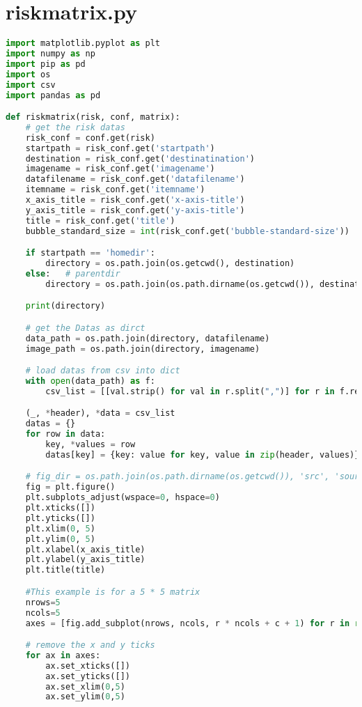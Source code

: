 
\section{riskmatrix.py}
\begin{lstlisting}[language=python, caption=Python LaTex - riskmatrix - Risxikomatrizen,captionpos=b,label={lst:riskmatrix},breaklines=true]
import matplotlib.pyplot as plt
import numpy as np
import pip as pd
import os
import csv
import pandas as pd

def riskmatrix(risk, conf, matrix):
    # get the risk datas
    risk_conf = conf.get(risk)
    startpath = risk_conf.get('startpath')
    destination = risk_conf.get('destinatination')
    imagename = risk_conf.get('imagename')
    datafilename = risk_conf.get('datafilename')
    itemname = risk_conf.get('itemname')
    x_axis_title = risk_conf.get('x-axis-title')
    y_axis_title = risk_conf.get('y-axis-title')
    title = risk_conf.get('title')
    bubble_standard_size = int(risk_conf.get('bubble-standard-size'))

    if startpath == 'homedir':
        directory = os.path.join(os.getcwd(), destination)
    else:   # parentdir
        directory = os.path.join(os.path.dirname(os.getcwd()), destination)

    print(directory)

    # get the Datas as dirct
    data_path = os.path.join(directory, datafilename)
    image_path = os.path.join(directory, imagename)

    # load datas from csv into dict
    with open(data_path) as f:
        csv_list = [[val.strip() for val in r.split(",")] for r in f.readlines()]

    (_, *header), *data = csv_list
    datas = {}
    for row in data:
        key, *values = row
        datas[key] = {key: value for key, value in zip(header, values)}

    # fig_dir = os.path.join(os.path.dirname(os.getcwd()), 'src', 'source')
    fig = plt.figure()
    plt.subplots_adjust(wspace=0, hspace=0)
    plt.xticks([])
    plt.yticks([])
    plt.xlim(0, 5)
    plt.ylim(0, 5)
    plt.xlabel(x_axis_title)
    plt.ylabel(y_axis_title)
    plt.title(title)

    #This example is for a 5 * 5 matrix
    nrows=5
    ncols=5
    axes = [fig.add_subplot(nrows, ncols, r * ncols + c + 1) for r in range(0, nrows) for c in range(0, ncols) ]

    # remove the x and y ticks
    for ax in axes:
        ax.set_xticks([])
        ax.set_yticks([])
        ax.set_xlim(0,5)
        ax.set_ylim(0,5)


\end{lstlisting}
